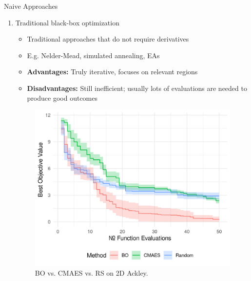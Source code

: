\documentclass[11pt,compress,t,notes=noshow, xcolor=table]{beamer}
\begin{document}
\begin{vbframe}{Naive Approaches}
\begin{enumerate}
\framebreak 

\item Traditional black-box optimization 
\begin{itemize}
\item Traditional approaches that do not require derivatives 
\item E.g. Nelder-Mead, simulated annealing, EAs 
\item \textbf{Advantages:} Truly iterative, focuses on relevant regions
\item \textbf{Disadvantages:} Still inefficient; usually lots of evaluations are needed to produce good outcomes
\end{itemize}
\vfill
\begin{figure}
\centering
\includegraphics[width=0.45\linewidth]{figure_man/black_box_2.png}
\caption*{\footnotesize \centering
    BO vs. CMAES vs. RS on 2D Ackley.
}
\end{figure}

\end{enumerate}
\end{vbframe}


\endlecture
\end{document}
